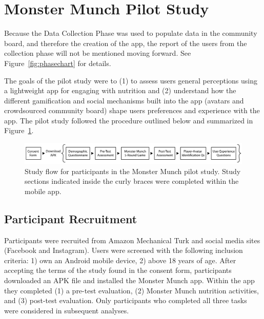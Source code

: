 \vspace{-5pt}
\section{Monster Munch Pilot Study}
Because the Data Collection Phase was used to populate data in the community board, and therefore the creation of the app, the report of the users from the collection phase will not be mentioned moving forward. See Figure~\ref{fig:phasechart} for details.

The goals of the pilot study were to (1) to assess users general perceptions using a lightweight app for engaging with nutrition and (2) understand how the different gamification and social mechanisms built into the app (avatars and crowdsourced community board) shape users preferences and experience with the app. The pilot study followed the procedure outlined below and summarized in Figure~\ref{fig:studyflow}. 


\begin{figure}[ht]
\includegraphics[width=\textwidth]{samples/images/figure-1.png}
\caption{Study flow for participants in the Monster Munch pilot study. Study sections indicated inside the curly braces were completed within the mobile app. }
\label{fig:studyflow}
\end{figure}

\vspace{-5pt}
\subsection{Participant Recruitment}
Participants were recruited from Amazon Mechanical Turk and social media sites (Facebook and Instagram). Users were screened with the following inclusion criteria: 1) own an Android mobile device, 2) above 18 years of age. After accepting the terms of the study found in the consent form, participants  downloaded an APK file and installed the Monster Munch app. Within the app they completed (1) a pre-test evaluation, (2) Monster Munch nutrition activities, and (3) post-test evaluation. Only participants who completed all three tasks were considered in subsequent analyses. 


